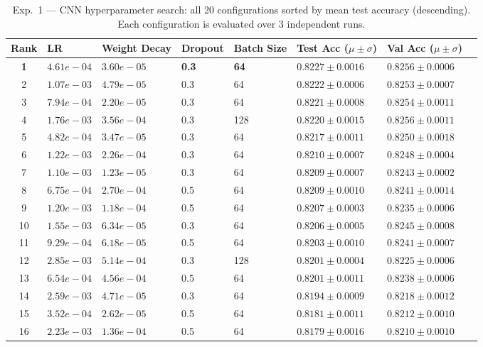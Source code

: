 \begin{table}[H]
\centering
\caption{Exp.\ 1 --- CNN hyperparameter search: all 20 configurations sorted by mean test accuracy (descending). Each configuration is evaluated over 3 independent runs.}
\label{tab:exp1_cnn}
\small
\begin{tabular}{clllllll}
\toprule
\textbf{Rank} & \textbf{LR} & \textbf{Weight Decay} & \textbf{Dropout} & \textbf{Batch Size} & \textbf{Test Acc} ($\mu\pm\sigma$) & \textbf{Val Acc} ($\mu\pm\sigma$) \\
\midrule
\textbf{1} & \textbf{$4.61e-04$} & \textbf{$3.60e-05$} & \textbf{0.3} & \textbf{64} & \textbf{$0.8227 \pm 0.0016$} & \textbf{$0.8256 \pm 0.0006$} \\
\midrule
2 & $1.07e-03$ & $4.79e-05$ & 0.3 & 64 & $0.8222 \pm 0.0006$ & $0.8253 \pm 0.0007$ \\
3 & $7.94e-04$ & $2.20e-05$ & 0.3 & 64 & $0.8221 \pm 0.0008$ & $0.8254 \pm 0.0011$ \\
4 & $1.76e-03$ & $3.56e-04$ & 0.3 & 128 & $0.8220 \pm 0.0015$ & $0.8256 \pm 0.0011$ \\
5 & $4.82e-04$ & $3.47e-05$ & 0.3 & 64 & $0.8217 \pm 0.0011$ & $0.8250 \pm 0.0018$ \\
6 & $1.22e-03$ & $2.26e-04$ & 0.3 & 64 & $0.8210 \pm 0.0007$ & $0.8248 \pm 0.0004$ \\
7 & $1.10e-03$ & $1.23e-05$ & 0.3 & 64 & $0.8209 \pm 0.0007$ & $0.8243 \pm 0.0002$ \\
8 & $6.75e-04$ & $2.70e-04$ & 0.5 & 64 & $0.8209 \pm 0.0010$ & $0.8241 \pm 0.0014$ \\
9 & $1.20e-03$ & $1.18e-04$ & 0.5 & 64 & $0.8207 \pm 0.0003$ & $0.8235 \pm 0.0006$ \\
10 & $1.55e-03$ & $6.34e-05$ & 0.3 & 64 & $0.8206 \pm 0.0005$ & $0.8245 \pm 0.0008$ \\
11 & $9.29e-04$ & $6.18e-05$ & 0.5 & 64 & $0.8203 \pm 0.0010$ & $0.8241 \pm 0.0007$ \\
12 & $2.85e-03$ & $5.14e-04$ & 0.3 & 128 & $0.8201 \pm 0.0004$ & $0.8225 \pm 0.0006$ \\
13 & $6.54e-04$ & $4.56e-04$ & 0.5 & 64 & $0.8201 \pm 0.0011$ & $0.8238 \pm 0.0006$ \\
14 & $2.59e-03$ & $4.71e-05$ & 0.3 & 64 & $0.8194 \pm 0.0009$ & $0.8218 \pm 0.0012$ \\
15 & $3.52e-04$ & $2.62e-05$ & 0.5 & 64 & $0.8181 \pm 0.0011$ & $0.8212 \pm 0.0010$ \\
16 & $2.23e-03$ & $1.36e-04$ & 0.5 & 64 & $0.8179 \pm 0.0016$ & $0.8210 \pm 0.0010$ \\

\end{tabular}
\end{table}
